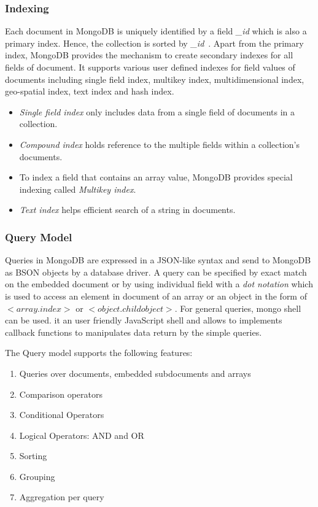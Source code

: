 \subsubsection{Indexing}\label{mong-xmark-indexing}
Each document in MongoDB is uniquely identified by a field \textit{\_id} which is also a primary index. Hence, the collection is sorted by \textit{\_id}~\citep{nosql/comparision}.
Apart from the primary index, MongoDB provides the mechanism to create secondary indexes for all fields of document. It supports various user defined indexes for field values of documents including single field index, multikey index, multidimensional index, geo-spatial index, text index and hash index.
\begin{itemize}
\item \textit{Single field index} only includes data from a single field of documents in a collection.
\item \textit{Compound index} holds reference to the multiple fields within a collection's documents.
\item To index a field that contains an array value, MongoDB provides special indexing called \textit{Multikey index}.
\item \textit{Text index} helps efficient search of a string in documents.
\end{itemize}

\subsubsection{Query Model}%
Queries in MongoDB are expressed in a JSON-like syntax and send to MongoDB as BSON objects by a database driver\citep{orend2010analysis}. A query can be specified by exact match on the embedded document or by using individual field with a \textit{dot notation} which is used to access an element in document of an array or an object in the form of  $<$$array$.$index$$>$ or  $<$$object$.$childobject$$>$. For general queries, mongo shell can be used. it an user friendly JavaScript shell and allows to implements callback functions to manipulates data return by the simple queries.  
\par
The Query model supports the following features:
\begin{enumerate}
	\item Queries over documents, embedded subdocuments and arrays
	\item Comparison operators
	\item Conditional Operators
	\item Logical Operators: AND and OR
	\item Sorting 
	\item Grouping
	\item Aggregation per query
\end{enumerate}


